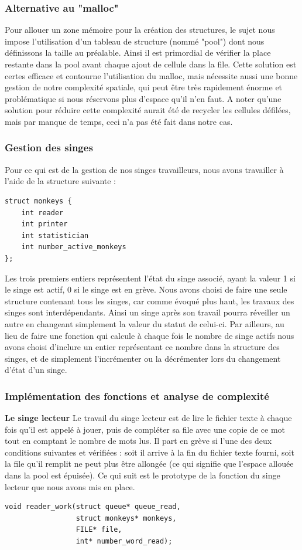 \documentclass[12pt]{article}
\begin{document}
\subsubsection{Alternative au "malloc"}
Pour allouer un zone mémoire pour la création des structures, le sujet nous impose l'utilisation d'un tableau de structure (nommé "pool") dont nous définissons la taille au préalable. Ainsi il est primordial de vérifier la place restante dans la pool avant chaque ajout de cellule dans la file. Cette solution est certes efficace et contourne l'utilisation du malloc, mais nécessite aussi une bonne gestion de notre complexité spatiale, qui peut être très rapidement énorme et problématique si nous réservons plus d'espace qu'il n'en faut. A noter qu'une solution pour réduire cette complexité aurait été de recycler les cellules défilées, mais par manque de temps, ceci n'a pas été fait dans notre cas. 

\subsubsection{Gestion des singes}
Pour ce qui est de la gestion de nos singes travailleurs, nous avons travailler à l'aide de la structure suivante :
\bigbreak
\begin{lstlisting}
struct monkeys {
    int reader
    int printer
    int statistician
    int number_active_monkeys
};
\end{lstlisting}
\bigbreak
Les trois premiers entiers représentent l'état du singe associé, ayant la valeur 1 si le singe est actif, 0 si le singe est en grève.
Nous avons choisi de faire une seule structure contenant tous les singes, car comme évoqué plus haut, les travaux des singes sont interdépendants. Ainsi un singe après son travail pourra réveiller un autre en changeant simplement la valeur du statut de celui-ci. Par ailleurs, au lieu de faire une fonction qui calcule à chaque fois le nombre de singe actifs nous avons choisi d'inclure un entier représentant ce nombre dans la structure des singes, et de simplement l'incrémenter ou la décrémenter lors du changement d'état d'un singe.

\subsubsection{Implémentation des fonctions et analyse de complexité}
\textbf{Le singe lecteur}
\bigbreak
\textnormal{Le travail du singe lecteur est de lire le fichier texte à chaque fois qu'il est appelé à jouer, puis de compléter sa file avec une copie de ce mot tout en comptant le nombre de mots lus. Il part en grève si l'une des deux conditions suivantes et vérifiées : soit il arrive à la fin du fichier texte fourni, soit la file qu'il remplit ne peut plus être allongée (ce qui signifie que l'espace allouée dans la pool est épuisée). Ce qui suit est le prototype de la fonction du singe lecteur que nous avons mis en place.}
\bigbreak
\begin{lstlisting}
void reader_work(struct queue* queue_read, 
                 struct monkeys* monkeys, 
                 FILE* file, 
                 int* number_word_read);
\end{lstlisting}
\bigbreak
\end{document}
